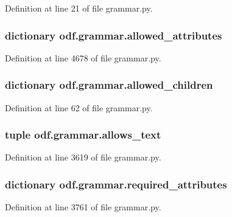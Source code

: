 Definition at line 21 of file grammar.\+py.

\hypertarget{namespaceodf_1_1grammar_a977fc09293e3ad44040d3d0dd5d76e50}{
\subsubsection[{allowed\+\_\+attributes}]{\setlength{\rightskip}{0pt plus 5cm}dictionary odf.\+grammar.\+allowed\+\_\+attributes}}\label{namespaceodf_1_1grammar_a977fc09293e3ad44040d3d0dd5d76e50}


Definition at line 4678 of file grammar.\+py.

\hypertarget{namespaceodf_1_1grammar_afedffb9bc285b6d478b821ee6f27db49}{
\subsubsection[{allowed\+\_\+children}]{\setlength{\rightskip}{0pt plus 5cm}dictionary odf.\+grammar.\+allowed\+\_\+children}}\label{namespaceodf_1_1grammar_afedffb9bc285b6d478b821ee6f27db49}


Definition at line 62 of file grammar.\+py.

\hypertarget{namespaceodf_1_1grammar_af74bda0d0f630e9047b1d30972fb8892}{
\subsubsection[{allows\+\_\+text}]{\setlength{\rightskip}{0pt plus 5cm}tuple odf.\+grammar.\+allows\+\_\+text}}\label{namespaceodf_1_1grammar_af74bda0d0f630e9047b1d30972fb8892}


Definition at line 3619 of file grammar.\+py.

\hypertarget{namespaceodf_1_1grammar_a5a5da9502e3a9a572fe272da463f1877}{
\subsubsection[{required\+\_\+attributes}]{\setlength{\rightskip}{0pt plus 5cm}dictionary odf.\+grammar.\+required\+\_\+attributes}}\label{namespaceodf_1_1grammar_a5a5da9502e3a9a572fe272da463f1877}


Definition at line 3761 of file grammar.\+py.

